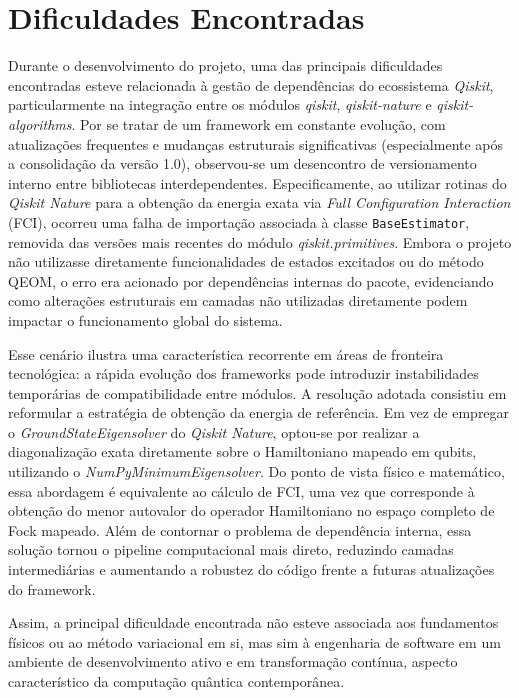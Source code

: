 \section{Dificuldades Encontradas}

Durante o desenvolvimento do projeto, uma das principais dificuldades 
encontradas esteve relacionada à gestão de dependências do ecossistema 
\textit{Qiskit}, particularmente na integração entre os módulos 
\textit{qiskit}, \textit{qiskit-nature} e \textit{qiskit-algorithms}. Por se 
tratar de um framework em constante evolução, com atualizações frequentes e 
mudanças estruturais significativas (especialmente após a consolidação da 
versão 1.0), observou-se um desencontro de versionamento interno entre 
bibliotecas interdependentes.
Especificamente, ao utilizar rotinas do \textit{Qiskit Nature} para a 
obtenção da energia exata via \textit{Full Configuration Interaction} (FCI), 
ocorreu uma falha de importação associada à classe \texttt{BaseEstimator}, 
removida das versões mais recentes do módulo \textit{qiskit.primitives}. 
Embora o projeto não utilizasse diretamente funcionalidades de estados 
excitados ou do método QEOM, o erro era acionado por dependências internas 
do pacote, evidenciando como alterações estruturais em camadas não 
utilizadas diretamente podem impactar o funcionamento global do sistema.

Esse cenário ilustra uma característica recorrente em áreas de fronteira 
tecnológica: a rápida evolução dos frameworks pode introduzir instabilidades 
temporárias de compatibilidade entre módulos. A resolução adotada consistiu 
em reformular a estratégia de obtenção da energia de referência. Em vez de 
empregar o \textit{GroundStateEigensolver} do \textit{Qiskit Nature}, optou-se por realizar a diagonalização exata diretamente sobre o Hamiltoniano 
mapeado em qubits, utilizando o \textit{NumPyMinimumEigensolver}. 
Do ponto de vista físico e matemático, essa abordagem é equivalente ao 
cálculo de FCI, uma vez que corresponde à obtenção do menor autovalor do 
operador Hamiltoniano no espaço completo de Fock mapeado. Além de contornar 
o problema de dependência interna, essa solução tornou o pipeline 
computacional mais direto, reduzindo camadas intermediárias e aumentando a 
robustez do código frente a futuras atualizações do framework.

Assim, a principal dificuldade encontrada não esteve associada aos 
fundamentos físicos ou ao método variacional em si, mas sim à engenharia de 
software em um ambiente de desenvolvimento ativo e em transformação contínua,
aspecto característico da computação quântica contemporânea.